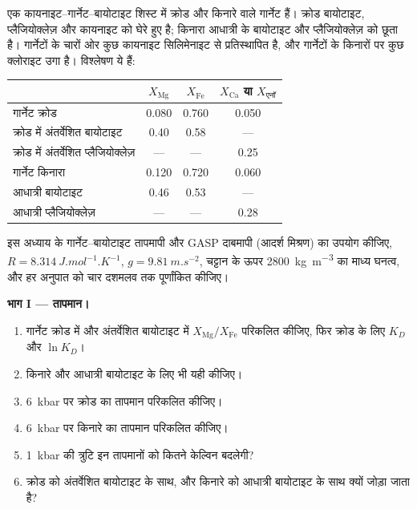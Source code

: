 \begin{problem}
\label{pb:b2:pt-paths:1}
एक कायनाइट--गार्नेट--बायोटाइट शिस्ट में क्रोड और किनारे वाले गार्नेट हैं। क्रोड
बायोटाइट, प्लैजियोक्लेज़ और कायनाइट को घेरे हुए है; किनारा आधात्री के बायोटाइट और प्लैजियोक्लेज़ को
छूता है। गार्नेटों के चारों ओर कुछ कायनाइट सिलिमेनाइट से प्रतिस्थापित है, और
गार्नेटों के किनारों पर कुछ क्लोराइट उगा है। विश्लेषण ये हैं:
\begin{center}
\small
\begin{tabular}{@{}lccc@{}}
\hline
 & $X_{\text{Mg}}$ & $X_{\text{Fe}}$ & $X_{\text{Ca}}$ या $X_{\text{एनॉ}}$\\
\hline
गार्नेट क्रोड & 0.080 & 0.760 & 0.050\\
क्रोड में अंतर्वेशित बायोटाइट & 0.40 & 0.58 & ---\\
क्रोड में अंतर्वेशित प्लैजियोक्लेज़ & --- & --- & 0.25\\
गार्नेट किनारा & 0.120 & 0.720 & 0.060\\
आधात्री बायोटाइट & 0.46 & 0.53 & ---\\
आधात्री प्लैजियोक्लेज़ & --- & --- & 0.28\\
\hline
\end{tabular}
\end{center}
इस अध्याय के गार्नेट--बायोटाइट तापमापी और GASP दाबमापी (आदर्श मिश्रण) का उपयोग कीजिए,
$R = \qty{8.314}{J.mol^{-1}.K^{-1}}$, $g = \qty{9.81}{m.s^{-2}}$, चट्टान के ऊपर
\qty{2800}{kg.m^{-3}} का माध्य घनत्व, और हर अनुपात को चार दशमलव तक पूर्णांकित कीजिए।

\noindent\textbf{भाग I --- तापमान।}
\begin{enumerate}
\item गार्नेट क्रोड में और अंतर्वेशित
बायोटाइट में $X_{\text{Mg}}/X_{\text{Fe}}$ परिकलित कीजिए, फिर क्रोड के लिए $K_D$ और $\ln K_D$।
\item किनारे और आधात्री बायोटाइट के लिए भी यही कीजिए।
\item \qty{6}{kbar} पर क्रोड का तापमान परिकलित कीजिए।
\item \qty{6}{kbar} पर किनारे का तापमान परिकलित कीजिए।
\item \qty{1}{kbar} की त्रुटि इन तापमानों को कितने केल्विन बदलेगी?
\item क्रोड को अंतर्वेशित बायोटाइट के साथ, और किनारे को आधात्री
बायोटाइट के साथ क्यों जोड़ा जाता है?
\end{enumerate}


\end{problem}
